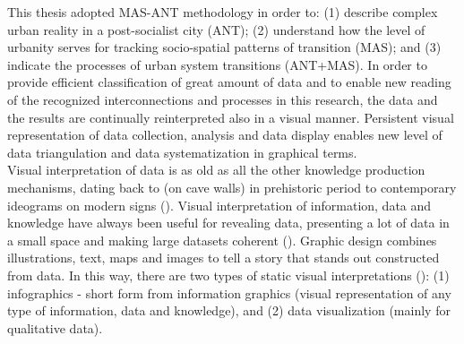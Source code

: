 \documentclass[11pt]{report}
\begin{document}
This thesis adopted MAS-ANT methodology in order to:
(1) describe complex urban reality in a post-socialist city (ANT);
(2) understand how the level of urbanity serves for tracking socio-spatial patterns of transition (MAS);
and
(3) indicate the processes of urban system transitions (ANT+MAS).
In order to provide efficient classification of great amount of data and to enable new reading of the recognized interconnections and processes in this research, the data and the results are continually reinterpreted also in a visual manner.
Persistent visual representation of data collection, analysis and data display enables new level of data triangulation and data systematization in graphical terms.
\\

Visual interpretation of data is as old as all the other knowledge production mechanisms, dating back to (on cave walls) in prehistoric period to contemporary ideograms on modern signs (\href{Krum}{\citealt{krum_cool_2013}}).
Visual interpretation of information, data and knowledge have always been useful for revealing data, presenting a lot of data in a small space and making large datasets coherent (\href{Tufte}{\citealt{tufte_visual_2001}}).
Graphic design combines illustrations, text, maps and images to tell a story that stands out constructed from data. 
In this way, there are two types of static visual interpretations (\href{Krum}{\citealt{krum_cool_2013}}):
(1) infographics - short form from information graphics (visual representation of any type of information, data and knowledge), and
(2) data visualization (mainly for qualitative data).
\\
\end{document}
